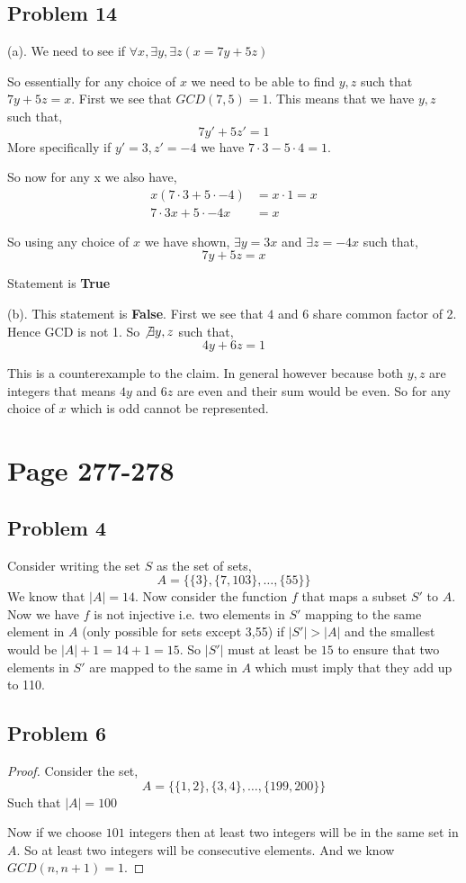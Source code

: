 \documentclass[a4paper]{report}
\begin{document}
\subsection*{Problem 14}

(a). We need to see if $\forall x, \exists y, \exists z (x = 7y + 5z)$

So essentially for any choice of $x$ we need to be able to find $y,z$ such that $7y + 5z = x$. First we see that $GCD(7,5) = 1$. This means that we have $y,z$ such that, 
$$ 7y' + 5z' = 1 $$ 
More specifically if $y' = 3, z' = -4$ we have $7 \cdot 3 - 5 \cdot 4 = 1$.

So now for any x we also have,  
\begin{align*}
    x(7\cdot 3 + 5\cdot -4) &= x \cdot 1 = x\\
    7\cdot 3x + 5\cdot -4x &= x
\end{align*}

So using any choice of $x$ we have shown, $\exists y = 3x$ and $\exists z = -4x$ such that, 
$$ 7y + 5z = x $$ 

Statement is \textbf{True} 

(b). This statement is \textbf{False}. First we see that $4$ and $6$ share common factor of 2. Hence GCD is not 1. So $ \not \exists y,z$ such that, 
$$ 4y + 6z = 1 $$ 

This is a counterexample to the claim. In general however because both $y,z$ are integers that means $4y $ and  $6z$ are even and their sum would be even. So for any choice of $x$ which is odd cannot be represented.


\section*{Page 277-278}
\subsection*{Problem 4}
Consider writing the  set $S$ as the set of sets, 
$$ A = \{\{3\}, \{7, 103\}, \dots, \{55\}\} $$ 
We know that $|A| = 14$. Now consider the function  $f$ that maps a subset $S'$ to $A$. Now we have $f$ is not injective i.e. two elements in $S'$ mapping to the same element in $A$ (only possible for sets except 3,55) if $|S'| > |A|$ and the smallest would be  $|A| + 1 = 14 + 1 = 15$. So  $|S'|$ must at least be  $15$ to ensure that two elements in $S'$ are mapped to the same in $A$ which must imply that they add up to 110.

\subsection*{Problem 6}
\begin{proof}
    Consider the set, 
    $$A =  \{\{1,2\},\{3,4\},\dots,\{199,200\}\} $$ 
    Such that $|A| = 100$

    Now if we choose  $101$ integers then at least two integers will be in the same set in $A$. So at least two integers will be consecutive elements. And we know  $ GCD(n,n+1) = 1$.
\end{proof}
\end{document}

